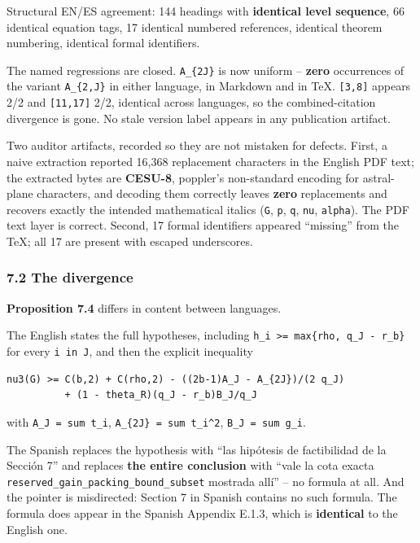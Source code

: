 \documentclass[
  10pt,
]{article}
\begin{document}
Structural EN/ES agreement: 144 headings with \textbf{identical level
sequence}, 66 identical equation tags, 17 identical numbered references,
identical theorem numbering, identical formal identifiers.

The named regressions are closed. \texttt{A\_\{2J\}} is now uniform --
\textbf{zero} occurrences of the variant \texttt{A\_\{2,J\}} in either
language, in Markdown and in TeX. \texttt{{[}3,8{]}} appears 2/2 and
\texttt{{[}11,17{]}} 2/2, identical across languages, so the
combined-citation divergence is gone. No stale version label appears in
any publication artifact.

Two auditor artifacts, recorded so they are not mistaken for defects.
First, a naive extraction reported 16,368 replacement characters in the
English PDF text; the extracted bytes are \textbf{CESU-8}, poppler's
non-standard encoding for astral-plane characters, and decoding them
correctly leaves \textbf{zero} replacements and recovers exactly the
intended mathematical italics (\texttt{G}, \texttt{p}, \texttt{q},
\texttt{nu}, \texttt{alpha}). The PDF text layer is correct. Second, 17
formal identifiers appeared ``missing'' from the TeX; all 17 are present
with escaped underscores.

\subsubsection{7.2 The divergence}\label{the-divergence}

\textbf{Proposition 7.4} differs in content between languages.

The English states the full hypotheses, including
\texttt{h\_i\ \textgreater{}=\ max\{rho,\ q\_J\ -\ r\_b\}} for every
\texttt{i\ in\ J}, and then the explicit inequality

\begin{verbatim}
nu3(G) >= C(b,2) + C(rho,2) - ((2b-1)A_J - A_{2J})/(2 q_J)
          + (1 - theta_R)(q_J - r_b)B_J/q_J
\end{verbatim}

with \texttt{A\_J\ =\ sum\ t\_i}, \texttt{A\_\{2J\}\ =\ sum\ t\_i\^{}2},
\texttt{B\_J\ =\ sum\ g\_i}.

The Spanish replaces the hypothesis with ``las hipótesis de factibilidad
de la Sección 7'' and replaces \textbf{the entire conclusion} with
``vale la cota exacta \texttt{reserved\_gain\_packing\_bound\_subset}
mostrada allí'' -- no formula at all. And the pointer is misdirected:
Section 7 in Spanish contains no such formula. The formula does appear
in the Spanish Appendix E.1.3, which is \textbf{identical} to the
English one.
\end{document}
